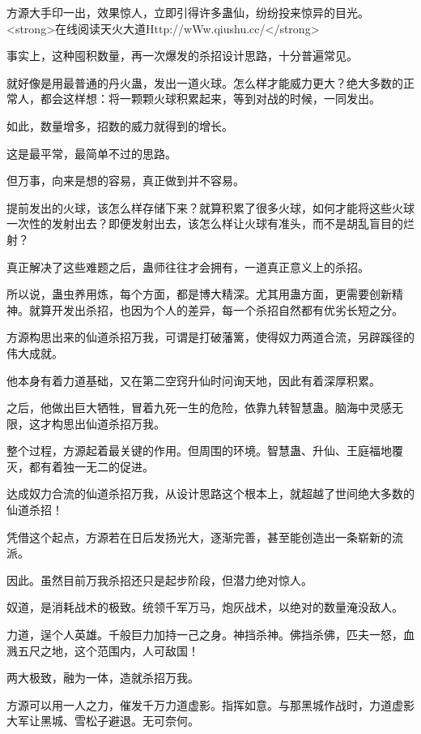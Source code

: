 
\begin{this_body}

方源大手印一出，效果惊人，立即引得许多蛊仙，纷纷投来惊异的目光。<strong>在线阅读天火大道Http://wWw.qiushu.cc/</strong>

事实上，这种囤积数量，再一次爆发的杀招设计思路，十分普遍常见。

就好像是用最普通的丹火蛊，发出一道火球。怎么样才能威力更大？绝大多数的正常人，都会这样想：将一颗颗火球积累起来，等到对战的时候，一同发出。

如此，数量增多，招数的威力就得到的增长。

这是最平常，最简单不过的思路。

但万事，向来是想的容易，真正做到并不容易。

提前发出的火球，该怎么样存储下来？就算积累了很多火球，如何才能将这些火球一次性的发射出去？即便发射出去，该怎么样让火球有准头，而不是胡乱盲目的烂射？

真正解决了这些难题之后，蛊师往往才会拥有，一道真正意义上的杀招。

所以说，蛊虫养用炼，每个方面，都是博大精深。尤其用蛊方面，更需要创新精神。就算开发出杀招，也因为个人的差异，每一个杀招自然都有优劣长短之分。

方源构思出来的仙道杀招万我，可谓是打破藩篱，使得奴力两道合流，另辟蹊径的伟大成就。

他本身有着力道基础，又在第二空窍升仙时问询天地，因此有着深厚积累。

之后，他做出巨大牺牲，冒着九死一生的危险，依靠九转智慧蛊。脑海中灵感无限，这才构思出仙道杀招万我。

整个过程，方源起着最关键的作用。但周围的环境。智慧蛊、升仙、王庭福地覆灭，都有着独一无二的促进。

达成奴力合流的仙道杀招万我，从设计思路这个根本上，就超越了世间绝大多数的仙道杀招！

凭借这个起点，方源若在日后发扬光大，逐渐完善，甚至能创造出一条崭新的流派。

因此。虽然目前万我杀招还只是起步阶段，但潜力绝对惊人。

奴道，是消耗战术的极致。统领千军万马，炮灰战术，以绝对的数量淹没敌人。

力道，逞个人英雄。千般巨力加持一己之身。神挡杀神。佛挡杀佛，匹夫一怒，血溅五尺之地，这个范围内，人可敌国！

两大极致，融为一体，造就杀招万我。

方源可以用一人之力，催发千万力道虚影。指挥如意。与那黑城作战时，力道虚影大军让黑城、雪松子避退。无可奈何。


\end{this_body}
